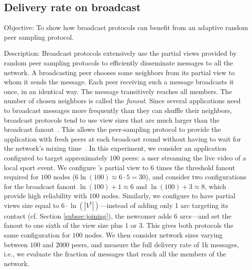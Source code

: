 

\subsection{Delivery rate on broadcast}

\begin{asparadesc}
\item [Objective:] To show how broadcast protocols can benefit from
  an adaptive random peer sampling protocol.
\item [Description:] Broadcast protocols extensively use the partial
  views provided by random peer sampling protocols to efficiently
  disseminate messages to all the network. A broadcasting peer chooses
  some neighbors from its partial view to whom it sends the
  message. Each peer receiving such a message broadcasts it once, in
  an identical way. The message transitively reaches all members. The
  number of chosen neighbors is called the \emph{fanout}. Since
  several applications need to broadcast messages more frequently than
  they can shuffle their neighbors, broadcast protocols tend to use
  view sizes that are much larger than the broadcast
  fanout~\cite{Frey09Middleware}. This allows the peer-sampling
  protocol to provide the application with fresh peers at each
  broadcast round without having to wait for the network's mixing
  time~\cite{jelasity2007gossip}. In this experiment, we consider an
  application configured to target approximately $100$ peers: a user
  streaming the live video of a local sport event. We configure
  \CYCLON's partial view to $6$ times the threshold fanout required
  for $100$ nodes ($6 \ln(100) \approx 6 \cdot 5 = 30$), and consider
  two configurations for the broadcast fanout $\ln(100)+1 \approx 6 $
  and $\ln(100)+3 \approx 8$, which provide high reliability with
  $100$ nodes. Similarly, we configure \SPRAY to have partial views
  size equal to $6 \cdot \ln(|V^t|)$---instead of adding only 1 arc
  targeting its contact (cf. Section \ref{subsec:joining}), the
  newcomer adds 6 arcs---and set the fanout to one sixth of the view
  size plus $1$ or $3$. This gives both protocols the same
  configuration for $100$ nodes.  We then consider network sizes
  varying between $100$ and $2000$ peers, and measure the full
  delivery rate of 1k messages, i.e., we evaluate the fraction of
  messages that reach all the members of the network.


\end{asparadesc}
